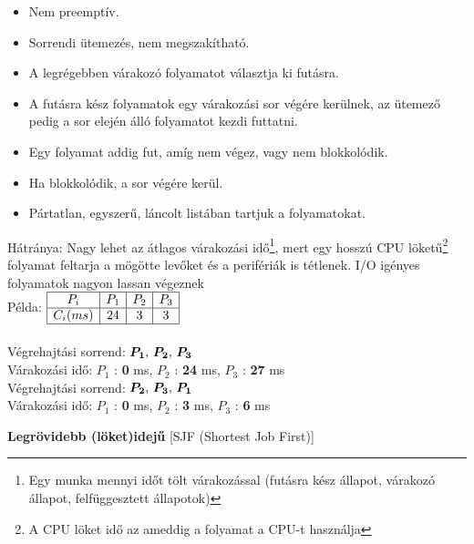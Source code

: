 \documentclass[tikz,12pt,margin=0px]{article}
\begin{document}
    \begin{itemize}[topsep=8pt,itemsep=4pt,partopsep=4pt, parsep=4pt]
        \item Nem preemptív.
        \item Sorrendi ütemezés, nem megszakítható.
        \item A legrégebben várakozó folyamatot választja ki futásra.
        \item A futásra kész folyamatok egy várakozási sor végére kerülnek, az ütemező pedig a sor elején álló folyamatot kezdi futtatni.
		\item Egy folyamat addig fut, amíg nem végez, vagy nem blokkolódik.
		\item Ha blokkolódik, a sor végére kerül.
		\item Pártatlan, egyszerű, láncolt listában tartjuk a folyamatokat.
    \end{itemize}

    \noindent Hátránya: Nagy lehet az átlagos várakozási idő\footnote{Egy munka mennyi időt tölt várakozással (futásra kész állapot, várakozó állapot, felfüggesztett állapotok)}, mert egy hosszú CPU löketű\footnote{A CPU löket idő az ameddig a folyamat a CPU-t használja} folyamat feltarja a mögötte levőket és a perifériák is tétlenek. I/O igényes folyamatok nagyon lassan végeznek\\
    
    {\small
    \noindent Példa: $\begin{array}{|c|c|c|c|}
                        \hline
                         P_{i} & P_{1} & P_{2} & P_{3} \\ \hline
                         C_{i}(ms) & 24 & 3 & 3 \\ \hline
                       \end{array}$\\\\
    
    \noindent Végrehajtási sorrend: $\boldsymbol{P_1$, $P_2$, $P_3}$\\
    \noindent Várakozási idő: $P_1$ : \textbf{0} ms, $P_2$ : \textbf{24} ms, $P_3$ : \textbf{27} ms\\

    \noindent Végrehajtási sorrend: $\boldsymbol{P_2$, $P_3$, $P_1}$\\
    \noindent Várakozási idő: $P_1$ : \textbf{0} ms, $P_2$ : \textbf{3} ms, $P_3$ : \textbf{6} ms\\
    }
    
    \noindent \textbf{Legrövidebb (löket)idejű} [SJF (Shortest Job First)]
\end{document}
